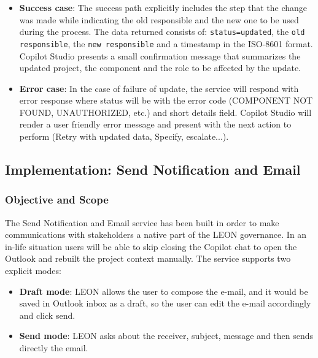 \begin{itemize}
    \item[\quad\textbullet] \textbf{Success case}: 
The success path explicitly includes the step that the change was made while indicating the old responsible and the new one to be used during the process. The data returned consists of: \texttt{status=updated}, the \texttt{old responsible}, the \texttt{new responsible} and a timestamp in the ISO-8601 format. Copilot Studio presents a small confirmation message that summarizes the updated project, the component and the role to be affected by the update.
    \item[\quad\textbullet] \textbf{Error case}: 
    In the case of failure of update, the service will respond with error response where status will be with the error code (COMPONENT NOT FOUND, UNAUTHORIZED, etc.) and short details field. Copilot Studio will render a user friendly error message and present with the next action to perform (Retry with updated data, Specify, escalate...).
\end{itemize}





\subsection{\textcolor[HTML]{003D99}{Implementation: Send Notification and Email}}
\label{sec:impl-notification}

\subsubsection{Objective and Scope}

The Send Notification and Email service has been built in order to make communications with stakeholders a native part of the LEON governance. In an in-life situation users will be able to skip closing the Copilot chat to open the Outlook and rebuilt the project context manually.
The service supports two explicit modes:
\begin{itemize}
    \item[\quad\textbullet] \textbf{Draft mode}:  LEON allows the user to compose the e-mail, and it would be saved in Outlook inbox as a draft, so the user can edit the e-mail accordingly and click send.

    \item[\quad\textbullet] \textbf{Send mode}: LEON asks about the receiver, subject, message and then sends directly the email.
\end{itemize}


